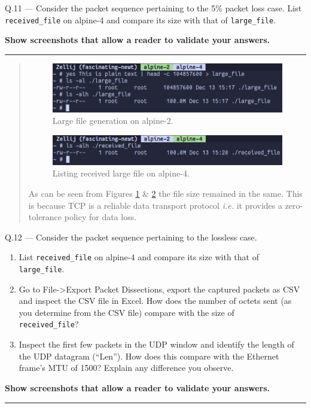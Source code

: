 \documentclass{article}
\newcommand\Que[2]{%
\begin{samepage}
\leavevmode\par
\noindent
Q.#1 --- #2\par\vspace{10pt}\hrule\vspace{10pt}
\end{samepage}}
\newenvironment{ans}
{\fbox{Answer}\begin{quote}\nopagebreak}
{\end{quote}}
\newcommand\ie{\emph{i.e.}}
\begin{document}
\Que{11}{
Consider the packet sequence pertaining to the 5\% packet loss
case. List \texttt{received\_file} on alpine-4 and compare its
size with that of \texttt{large\_file}.

\textbf{Show screenshots that allow a reader to validate your
answers.}}
\begin{ans}
\begin{figure}[H]
\centering
\includegraphics[width=16cm]{data/large-file-alpine-2.png}
\caption{Large file generation on alpine-2.}
\label{fig:file-gen}
\end{figure}

\begin{figure}[H]
\centering
\includegraphics[width=16cm]{data/alpine-4-received-file.png}
\caption{Listing received large file on alpine-4.}
\label{fig:file-receive}
\end{figure}

As can be seen from Figures \ref{fig:file-gen} \&
\ref{fig:file-receive} the file size remained in the same.
This is because TCP is a reliable data transport protocol
\ie{} it provides a zero-tolerance policy for data loss.
\end{ans}

\newpage

\Que{12}{
Consider the packet sequence pertaining to the lossless case.
\begin{enumerate}
\item List \texttt{received\_file} on alpine-4 and compare its
      size with that of \\ \texttt{large\_file}.
\item Go to File->Export Packet Dissections, export the captured
      packets as CSV and inspect the CSV file in Excel. How does
      the number of octets sent (as you determine from the CSV
      file) compare with the size of\\ \texttt{received\_file}?
\item Inspect the first few packets in the UDP window and
      identify the length of the UDP datagram (``Len''). How does
      this compare with the Ethernet frame's MTU of 1500? Explain
      any difference you observe.
\end{enumerate}

\textbf{Show screenshots that allow a reader to validate your answers.}}
\end{document}
